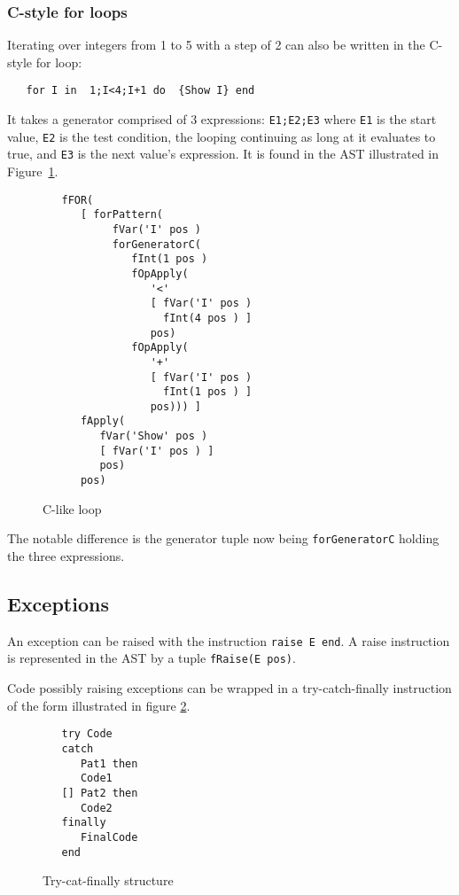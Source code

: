 \documentclass[a4paper]{memoir}
\begin{document}
\subsubsection{C-style for loops}
Iterating over integers from 1 to 5 with a step of 2 can also be written in the C-style for loop:
\begin{lstlisting}
   for I in  1;I<4;I+1 do  {Show I} end
\end{lstlisting}
It takes a generator comprised of 3 expressions: \lstinline!E1;E2;E3! where
\lstinline!E1! is the start value, \lstinline!E2! is the test condition, the
looping continuing as long at it evaluates to true, and \lstinline!E3! is the
next value's expression.
It is found in the AST illustrated in Figure~\ref{fig:forc}.
\begin{figure}[h]
\begin{lstlisting}
   fFOR(
      [ forPattern(
           fVar('I' pos )
           forGeneratorC(
              fInt(1 pos )
              fOpApply(
                 '<'
                 [ fVar('I' pos )
                   fInt(4 pos ) ]
                 pos)
              fOpApply(
                 '+'
                 [ fVar('I' pos )
                   fInt(1 pos ) ]
                 pos))) ]
      fApply(
         fVar('Show' pos )
         [ fVar('I' pos ) ]
         pos)
      pos)
\end{lstlisting}
\caption{C-like loop}
\label{fig:forc}
\end{figure}


The notable difference is the generator tuple now being
\lstinline!forGeneratorC! holding the three expressions.

\subsection{Exceptions}\label{sec:input:exceptions}
An exception can be raised with the instruction \lstinline!raise E end!.
A raise instruction is represented in the AST by a tuple \lstinline!fRaise(E pos)!.

Code possibly raising exceptions can be wrapped in a try-catch-finally
instruction of the form illustrated in figure \ref{fig:trycatchfinally}.
\begin{figure}[h]
\begin{lstlisting}
   try Code
   catch
      Pat1 then
      Code1
   [] Pat2 then
      Code2
   finally
      FinalCode
   end
\end{lstlisting}
\caption{Try-cat-finally structure}
\label{fig:trycatchfinally}
\end{figure}
\end{document}

